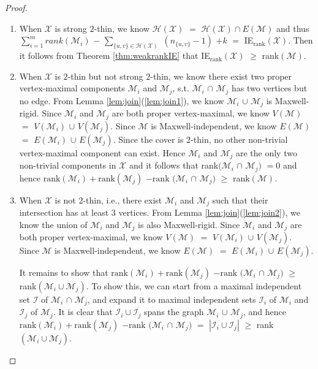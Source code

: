 \documentclass[10pt]{article}
\def\M{\mathcal {M}}
\def\I{\mathcal {I}}
\def\H{\mathcal {H}}
\def\X{\mathcal {X}}
\begin{document}
\begin{proof}
\begin{enumerate}
\item When $\X$ is strong $2$-thin, we know $\H(\X)$ $=$ $\H(\X) \cap E(\M)$ and thus $\sum_{i=1}^m rank(\M_i)$ $-$ $\sum_{{\{u, v\}} \in \H(\X)}$ $(n_{\{u, v\}} -1)$ $+k$ $=$ IE$_\text{rank}(\X)$. Then it follows from Theorem \ref{thm:weakrankIE} that IE$_\text{rank}(\X)$ $\geq$ rank$(\M)$.

\item When $\X$ is $2$-thin but not strong $2$-thin, we know there exist two proper vertex-maximal components $\M_i$ and $\M_j$, s.t. $\M_i$ $\cap$ $\M_j$ has two vertices but no edge. From Lemma \ref{lem:join}(\ref{lem:join1}), we know $\M_i$ $\cup$ $\M_j$ is Maxwell-rigid. Since $\M_i$ and $\M_j$ are both proper vertex-maximal, we know $V(\M)$ $= $ $V(\M_i)$ $\cup$ $V(\M_j)$. Since $\M$ is Maxwell-independent, we know $E(\M)$ $= $ $E(\M_i)$ $\cup$ $E(\M_j)$. Since the cover is $2$-thin, no other non-trivial vertex-maximal component can exist. Hence $\M_i$ and $\M_j$ are the only two non-trivial components in $\X$ and it follows that rank$(\M_i$ $\cap$ $\M_j)$ $=0$ and hence $\text{rank}(\M_i) +\text{rank}(\M_j)$ $- \text{rank}$ $(\M_i$ $\cap$ $\M_j)$  $\geq$ rank$(\M)$.




\item When $\X$ is not $2$-thin, i.e., there exist $\M_i$ and $\M_j$ such that their intersection has at least $3$ vertices. From Lemma \ref{lem:join}(\ref{lem:join2}), we know the union of $\M_i$ and $\M_j$ is also Maxwell-rigid. Since $\M_i$ and $\M_j$ are both proper vertex-maximal, we know $V(\M)$ $= $ $V(\M_i)$ $\cup$ $V(\M_j)$. Since $\M$ is Maxwell-independent, we know $E(\M)$ $= $ $E(\M_i)$ $\cup$ $E(\M_j)$.

It remains to show that $\text{rank}(\M_i) +\text{rank}(\M_j)$ $- \text{rank}$ $(\M_i$ $\cap$ $\M_j)$ $\geq$ rank$(\M_i\cup \M_j)$. To show this, we can start from a maximal independent set $\I$ of $\M_i$ $\cap$ $\M_j$, and expand it to maximal independent sets $\I_i$ of $\M_i$ and $\I_j$ of $\M_j$. It is clear that $\I_i \cup \I_j$ spans the graph $\M_i$ $\cup$ $\M_j$, and hence $\text{rank}(\M_i) +\text{rank}(\M_j)$ $- \text{rank}$ $(\M_i$ $\cap$ $\M_j)$ $=$ $|\I_i \cup \I_j|$ $\geq$ rank$(\M_i\cup \M_j)$.




\end{enumerate}


\end{proof}
\end{document}

